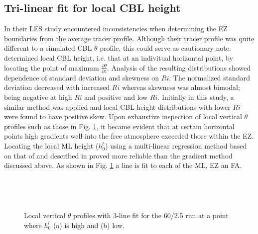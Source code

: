 \subsection{Tri-linear fit for local CBL height}
In their LES study \cite{BrooksFowler2} encountered inconsistencies when determining the EZ boundaries from the average tracer profile.  Although their tracer profile was quite different to a simulated CBL $\overline{\theta}$ profile, this could serve as cautionary note.  \cite{SullMoengStev} determined local CBL height, i.e. that at an indivitual horizontal point, by locating the point of maximum $\frac{\partial \theta}{\partial z}$.  Analysis of the resulting distributions showed dependence of standard deviation and skewness on $Ri$.  The normalized standard deviation decreased with increased $Ri$ whereas skewness was almost bimodal; being negative at high $Ri$ and positive and low $Ri$.  Initially in this study, a similar method was applied and local CBL height distributions with lower $Ri$ were found to have positive skew.  Upon exhaustive inspection of local vertical $\theta$  profiles such as those in Fig. \ref{fig:rssfitshigh}, it became evident that at certain horizontal points high gradients well into the free atmosphere exceeded those within the EZ.  Locating the local ML height ($h^{l}_{0}$) using a multi-linear regression method based on that of \citep{Vieth} and described in \citep{NChap14} proved more reliable than the gradient method discussed above.  As shown in Fig. \ref{fig:rssfitshigh} a line is fit to each of the ML, EZ an FA.\\
  
\begin{figure}[htbp]
\begin{minipage}[b]{0.5\linewidth}
        \\
        \end{minipage}             
\quad
\begin{minipage}[b]{0.5\linewidth}
        \\
       
       \end{minipage}
\caption[High local ML ]{Local vertical $\theta$ profiles with 3-line fit for the 60/2.5 run at a point where $h^{l}_{0}$ (a) is high and (b) low.}
        
        \label{fig:rssfitshigh}
\end{figure}

